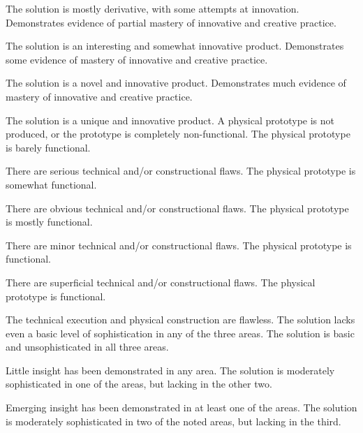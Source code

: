 \documentclass{../fal_assignment}
\begin{document}
\begin{markingrubric}
            \par The solution is mostly derivative, with some attempts at innovation.
        \grade Demonstrates evidence of partial mastery of innovative and creative practice.
            \par The solution is an interesting and somewhat innovative product.
        \grade Demonstrates some evidence of mastery of innovative and creative practice.
            \par The solution is a novel and innovative product.
        \grade Demonstrates much evidence of mastery of innovative and creative practice.
            \par The solution is a unique and innovative product.
        \grade\fail A physical prototype is not produced, or the prototype is completely non-functional.
        \grade The physical prototype is barely functional.
            \par There are serious technical and/or constructional flaws.
        \grade The physical prototype is somewhat functional.
            \par There are obvious technical and/or constructional flaws.
        \grade The physical prototype is mostly functional.
            \par There are minor technical and/or constructional flaws.
        \grade The physical prototype is functional.
            \par There are superficial technical and/or constructional flaws.
        \grade The physical prototype is functional.
            \par The technical execution and physical construction are flawless.
        \grade\fail The solution lacks even a basic level of sophistication in any of the three areas.
        \grade The solution is basic and unsophisticated in all three areas.
            \par Little insight has been demonstrated in any area.
        \grade The solution is moderately sophisticated in one of the areas, but lacking in the other two.
            \par Emerging insight has been demonstrated in at least one of the areas.
        \grade The solution is moderately sophisticated in two of the noted areas, but lacking in the third.

\end{markingrubric}
\end{document}
